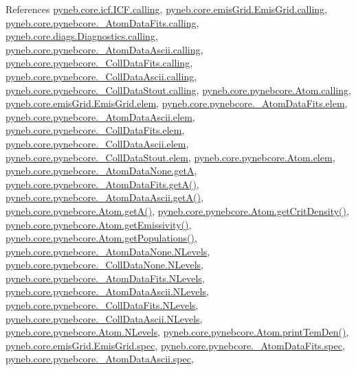 References \hyperlink{icf_8py_source_l00016}{pyneb.\-core.\-icf.\-I\-C\-F.\-calling}, \hyperlink{emis_grid_8py_source_l00044}{pyneb.\-core.\-emis\-Grid.\-Emis\-Grid.\-calling}, \hyperlink{pynebcore_8py_source_l00097}{pyneb.\-core.\-pynebcore.\-\_\-\-Atom\-Data\-Fits.\-calling}, \hyperlink{diags_8py_source_l00169}{pyneb.\-core.\-diags.\-Diagnostics.\-calling}, \hyperlink{pynebcore_8py_source_l00318}{pyneb.\-core.\-pynebcore.\-\_\-\-Atom\-Data\-Ascii.\-calling}, \hyperlink{pynebcore_8py_source_l00585}{pyneb.\-core.\-pynebcore.\-\_\-\-Coll\-Data\-Fits.\-calling}, \hyperlink{pynebcore_8py_source_l00936}{pyneb.\-core.\-pynebcore.\-\_\-\-Coll\-Data\-Ascii.\-calling}, \hyperlink{pynebcore_8py_source_l01156}{pyneb.\-core.\-pynebcore.\-\_\-\-Coll\-Data\-Stout.\-calling}, \hyperlink{pynebcore_8py_source_l01229}{pyneb.\-core.\-pynebcore.\-Atom.\-calling}, \hyperlink{emis_grid_8py_source_l00048}{pyneb.\-core.\-emis\-Grid.\-Emis\-Grid.\-elem}, \hyperlink{pynebcore_8py_source_l00090}{pyneb.\-core.\-pynebcore.\-\_\-\-Atom\-Data\-Fits.\-elem}, \hyperlink{pynebcore_8py_source_l00311}{pyneb.\-core.\-pynebcore.\-\_\-\-Atom\-Data\-Ascii.\-elem}, \hyperlink{pynebcore_8py_source_l00577}{pyneb.\-core.\-pynebcore.\-\_\-\-Coll\-Data\-Fits.\-elem}, \hyperlink{pynebcore_8py_source_l00927}{pyneb.\-core.\-pynebcore.\-\_\-\-Coll\-Data\-Ascii.\-elem}, \hyperlink{pynebcore_8py_source_l01163}{pyneb.\-core.\-pynebcore.\-\_\-\-Coll\-Data\-Stout.\-elem}, \hyperlink{pynebcore_8py_source_l01219}{pyneb.\-core.\-pynebcore.\-Atom.\-elem}, \hyperlink{pynebcore_8py_source_l00067}{pyneb.\-core.\-pynebcore.\-\_\-\-Atom\-Data\-None.\-get\-A}, \hyperlink{pynebcore_8py_source_l00212}{pyneb.\-core.\-pynebcore.\-\_\-\-Atom\-Data\-Fits.\-get\-A()}, \hyperlink{pynebcore_8py_source_l00487}{pyneb.\-core.\-pynebcore.\-\_\-\-Atom\-Data\-Ascii.\-get\-A()}, \hyperlink{pynebcore_8py_source_l01537}{pyneb.\-core.\-pynebcore.\-Atom.\-get\-A()}, \hyperlink{pynebcore_8py_source_l01759}{pyneb.\-core.\-pynebcore.\-Atom.\-get\-Crit\-Density()}, \hyperlink{pynebcore_8py_source_l01782}{pyneb.\-core.\-pynebcore.\-Atom.\-get\-Emissivity()}, \hyperlink{pynebcore_8py_source_l01562}{pyneb.\-core.\-pynebcore.\-Atom.\-get\-Populations()}, \hyperlink{pynebcore_8py_source_l00069}{pyneb.\-core.\-pynebcore.\-\_\-\-Atom\-Data\-None.\-N\-Levels}, \hyperlink{pynebcore_8py_source_l00082}{pyneb.\-core.\-pynebcore.\-\_\-\-Coll\-Data\-None.\-N\-Levels}, \hyperlink{pynebcore_8py_source_l00098}{pyneb.\-core.\-pynebcore.\-\_\-\-Atom\-Data\-Fits.\-N\-Levels}, \hyperlink{pynebcore_8py_source_l00319}{pyneb.\-core.\-pynebcore.\-\_\-\-Atom\-Data\-Ascii.\-N\-Levels}, \hyperlink{pynebcore_8py_source_l00586}{pyneb.\-core.\-pynebcore.\-\_\-\-Coll\-Data\-Fits.\-N\-Levels}, \hyperlink{pynebcore_8py_source_l00933}{pyneb.\-core.\-pynebcore.\-\_\-\-Coll\-Data\-Ascii.\-N\-Levels}, \hyperlink{pynebcore_8py_source_l01231}{pyneb.\-core.\-pynebcore.\-Atom.\-N\-Levels}, \hyperlink{pynebcore_8py_source_l02324}{pyneb.\-core.\-pynebcore.\-Atom.\-print\-Tem\-Den()}, \hyperlink{emis_grid_8py_source_l00049}{pyneb.\-core.\-emis\-Grid.\-Emis\-Grid.\-spec}, \hyperlink{pynebcore_8py_source_l00091}{pyneb.\-core.\-pynebcore.\-\_\-\-Atom\-Data\-Fits.\-spec}, \hyperlink{pynebcore_8py_source_l00312}{pyneb.\-core.\-pynebcore.\-\_\-\-Atom\-Data\-Ascii.\-spec}, 